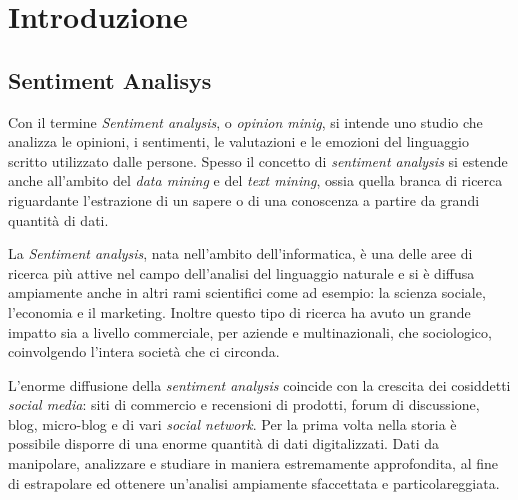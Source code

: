 \documentclass[a4paper,12pt,openright,twoside]{report}
\makeatletter
\theoremstyle{definition}
\def\cleardoublepage{\clearpage\if@twoside \ifodd\c@page\else
\hbox{}
\vspace*{\fill}
\begin{center}
\textit{ }
\end{center}
\vspace{\fill}
\thispagestyle{empty}
\newpage
\if@twocolumn\hbox{}\newpage\fi\fi\fi}
\makeatother
\begin{document}
\clearpage{\pagestyle{empty}\cleardoublepage}
\tableofcontents                        %
\rhead[\fancyplain{}{\bfseries\leftmark}]{\fancyplain{}{\bfseries\thepage}}

\lhead[\fancyplain{}{\bfseries\thepage}]{\fancyplain{}{\bfseries\rightmark}}

\chapter{Introduzione}

\section{Sentiment Analisys}
\label{sec:sentAnal}
Con il termine \emph{Sentiment analysis}, o \emph{opinion minig}, si intende uno studio 
che analizza le opinioni, i sentimenti, le valutazioni e le
emozioni del linguaggio scritto utilizzato dalle persone.
Spesso il concetto di \emph{sentiment analysis} si estende anche all'ambito del \emph{data mining} e
del \emph{text mining}, ossia quella branca di ricerca riguardante l'estrazione di un sapere o 
di una conoscenza a partire da grandi quantità di dati.

La \emph{Sentiment analysis}, nata nell'ambito dell'informatica, è una delle aree di ricerca più attive 
nel campo dell'analisi del linguaggio naturale e si è diffusa
ampiamente anche in altri rami scientifici come ad esempio: la scienza sociale,
l'economia e il marketing. Inoltre questo tipo di ricerca
ha avuto un grande impatto sia a livello commerciale, per aziende e multinazionali, che sociologico, 
coinvolgendo l'intera società che ci circonda.

L'enorme diffusione della \emph{sentiment analysis} coincide con la 
crescita dei cosiddetti \emph{social media}: siti di commercio e recensioni di prodotti,
forum di discussione, blog, micro-blog e di vari \emph{social network}.
Per la prima volta nella storia è possibile disporre di una
enorme quantità di dati digitalizzati. Dati da manipolare, analizzare e studiare in maniera
estremamente approfondita, al fine di estrapolare ed ottenere un'analisi
ampiamente sfaccettata e particolareggiata.
\end{document}
